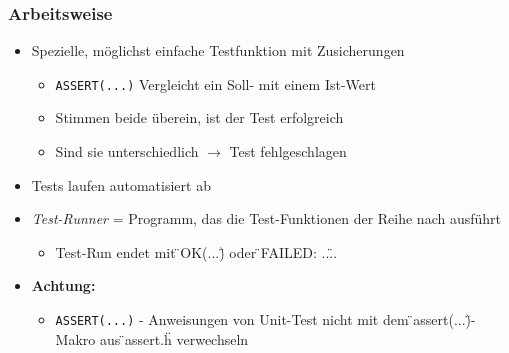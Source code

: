 \subsubsection{Arbeitsweise}
\begin{itemize}
	\item Spezielle, möglichst einfache Testfunktion mit Zusicherungen
	\begin{itemize}
		\item \texttt{ASSERT(...)} Vergleicht ein Soll- mit einem Ist-Wert
		\item Stimmen beide überein, ist der Test erfolgreich
		\item Sind sie unterschiedlich $\rightarrow$ Test fehlgeschlagen
	\end{itemize}
	\item Tests laufen automatisiert ab
	\item \textit{Test-Runner} = Programm, das die Test-Funktionen der Reihe nach ausführt
	\begin{itemize}
		\item Test-Run endet mit \"{}OK(...)\"{} oder \"{}FAILED: ...\"{}.
	\end{itemize}
	\item \textbf{Achtung: }
	\begin{itemize}
		\item \texttt{ASSERT(...)} - Anweisungen von Unit-Test nicht mit dem \"{}assert(...)\"{}-Makro aus \"{}assert.h\"{} verwechseln
	\end{itemize}
\end{itemize}

